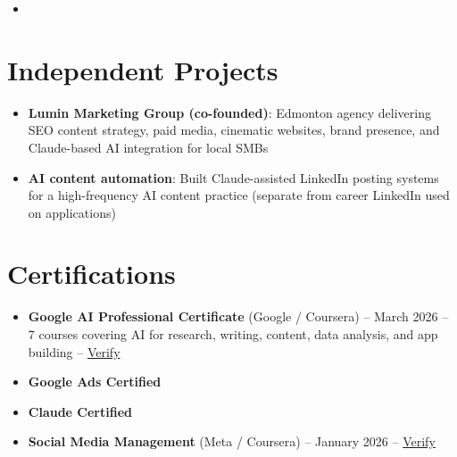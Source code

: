 \documentclass[11pt,a4paper,sans]{moderncv}
\begin{document}
\begin{itemize}
\vspace{3pt}

\item{}

\end{itemize}

\section{Independent Projects}
\vspace{1pt}
\begin{itemize}
\item \textbf{Lumin Marketing Group (co-founded)}: Edmonton agency delivering SEO content strategy, paid media, cinematic websites, brand presence, and Claude-based AI integration for local SMBs
\item \textbf{AI content automation}: Built Claude-assisted LinkedIn posting systems for a high-frequency AI content practice (separate from career LinkedIn used on applications)
\end{itemize}

\section{Certifications}
\vspace{1pt}
\begin{itemize}
\item \textbf{Google AI Professional Certificate} (Google / Coursera) -- March 2026 -- 7 courses covering AI for research, writing, content, data analysis, and app building -- \href{https://www.coursera.org/account/accomplishments/verify/professional-cert/54E1P3RBHVL8}{Verify}
\item \textbf{Google Ads Certified}
\item \textbf{Claude Certified}
\item \textbf{Social Media Management} (Meta / Coursera) -- January 2026 -- \href{https://www.coursera.org/account/accomplishments/verify/7NOVGMU2L69G}{Verify}
\end{itemize}
\end{document}
